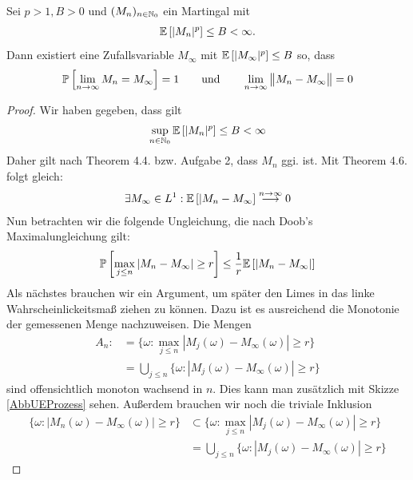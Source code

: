 \documentclass[12pt,a4paper]{article}
\begin{document}
\begin{theorem}\enter
Sei $p>1,B>0$ und $(M_n)_{n\in\mathbb{N}_0}$ ein Martingal mit 
\begin{align*}
\mathbb{E}\left[|M_n|^p\right]\leq B<\infty.
\end{align*}
Dann existiert eine Zufallsvariable $M_\infty$ mit $\mathbb{E}\left[|M_\infty|^p\right]\leq B$ so, dass
\begin{align*}
\mathbb{P}\left[\lim\limits_{n\to\infty} M_n=M_\infty\right]=1
\qquad\text{und}\qquad
\lim\limits_{n\to\infty}\big\Vert M_n-M_\infty\big\Vert=0
\end{align*}
\end{theorem}
\begin{proof}
	Wir haben gegeben, dass gilt
	\begin{align*}
		\sup\limits_{n\in\mathbb{N}_0} \mathbb{E}\left[|M_n|^p\right] \leq B < \infty
	\end{align*}
	Daher gilt nach Theorem 4.4. bzw. Aufgabe 2, dass $M_n$ ggi. ist.
	Mit Theorem 4.6. folgt gleich:
	\begin{align*}
		\exists M_\infty \in L^1 : \mathbb{E}\left[|M_n - M_\infty\right]\stackrel{n\rightarrow \infty}{\longrightarrow} 0
	\end{align*}
	Nun betrachten wir die folgende Ungleichung, die nach Doob's Maximalungleichung gilt:
	\begin{align*}
		\mathbb{P}\left[\max\limits_{j\leq n} |M_n - M_\infty| \geq r\right] \leq \frac{1}{r} \mathbb{E}\left[|M_n-M_\infty|\right]
	\end{align*}
	Als nächstes brauchen wir ein Argument, um später den Limes in das linke Wahrscheinlickeitsmaß ziehen zu können. Dazu ist es ausreichend die Monotonie der gemessenen Menge nachzuweisen. Die Mengen
	\begin{align*}
		A_n:&=\lbrace \omega : \max\limits_{j\leq n} |M_j(\omega) - M_\infty(\omega)| \geq r\rbrace \\
				&=\bigcup\limits_{j\leq n}\lbrace \omega : |M_j(\omega) - M_\infty(\omega)| \geq r\rbrace
	\end{align*}
	sind offensichtlich monoton wachsend in $n$. Dies kann man zusätzlich mit Skizze \ref{AbbUEProzess} sehen.
	Außerdem brauchen wir noch die triviale Inklusion
	\begin{align*}
		\lbrace \omega : |M_n(\omega) - M_\infty(\omega)| \geq r\rbrace
		&\subset \lbrace \omega : \max\limits_{j\leq n} |M_j(\omega) - M_\infty(\omega)| \geq r\rbrace \\
		&=\bigcup\limits_{j\leq n}\lbrace \omega : |M_j(\omega) - M_\infty(\omega)| \geq r\rbrace

\end{align*}
\end{proof}
\end{document}
